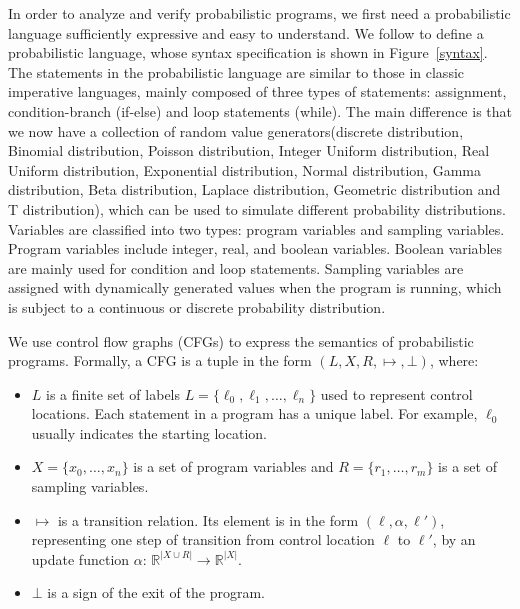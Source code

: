 \documentclass[sigconf,review, anonymous]{acmart}
\begin{document}
In order to analyze and verify probabilistic programs, we first need a probabilistic language sufficiently expressive and easy to understand. We follow \cite{Sankaranarayanan2013Static} to define a probabilistic language, whose syntax specification is shown in Figure~\ref{syntax}. The statements in the probabilistic language are similar to those in classic imperative languages, mainly composed of three types of statements: assignment, condition-branch (if-else) and loop statements (while). The main difference is that we now have a collection of random value generators(discrete distribution, Binomial distribution, Poisson distribution, Integer Uniform distribution, Real Uniform distribution, Exponential distribution, Normal distribution, Gamma distribution, Beta distribution, Laplace distribution, Geometric distribution and T distribution), which can be used to simulate different probability distributions. Variables are classified into two types: program variables and sampling variables. Program variables include integer, real, and boolean variables. Boolean variables are mainly used for condition and loop statements. Sampling variables are assigned with dynamically generated values when the program is running, which is subject to a continuous or discrete probability distribution.


We use control flow graphs (CFGs) to express the semantics of probabilistic programs. Formally, a CFG is a tuple in the form $(L,X,R,\mapsto,\bot)$, where:

\begin{itemize}
	\item $L$ is a finite set of labels $L=\{\ell_0,\ell_1,\dots,\ell_n\}$ used to represent control locations. Each statement in a program has a unique label. For example, $\ell_0$ usually indicates the starting location.
	
	\item $X=\{x_0,\dots,x_n\}$ is a set of program variables and $R=\{r_1,\dots,r_m\}$ is a set of sampling variables.
	
	\item $\mapsto$ is a transition relation. Its element is in the form $(\ell,\alpha,\ell')$, representing one step of transition from control location $\ell$ to $\ell'$, by an update function $\alpha$: $\mathbb{R}^{|X\cup R|}\to \mathbb{R}^{|X|}$.
	
	\item $\bot$ is a sign of the exit of the program.
\end{itemize}
\end{document}
